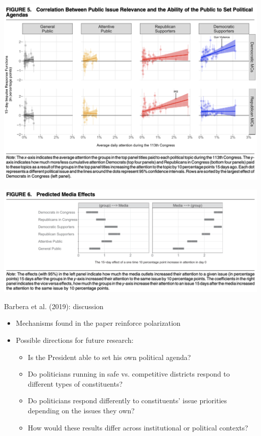 \documentclass[english]{beamer}
\begin{document}
\begin{frame}{}
        \centering
    \includegraphics[width=1 \textwidth]{Images/barbera_res3.png}
\end{frame}

\begin{frame}{}
        \centering
    \includegraphics[width=1 \textwidth]{Images/barbera_mediaeff.png}
\end{frame}

\begin{frame}{Barbera et al. (2019): discussion}
\begin{itemize}\setlength{\itemsep}{1.2em}
    \item Mechanisms found in the paper reinforce polarization
    \item Possible directions for future research:
    \begin{itemize}\setlength{\itemsep}{1.2em}\vspace{5pt}
        \item Is the President able to set his own political agenda?
        \item Do politicians running in safe vs. competitive districts respond to different types of constituents?
        \item Do politicians respond differently to constituents' issue priorities depending on the issues they own?
        \item How would these results differ across institutional or political contexts?
    \end{itemize}
\end{itemize}
    
\end{frame}
\end{document}
